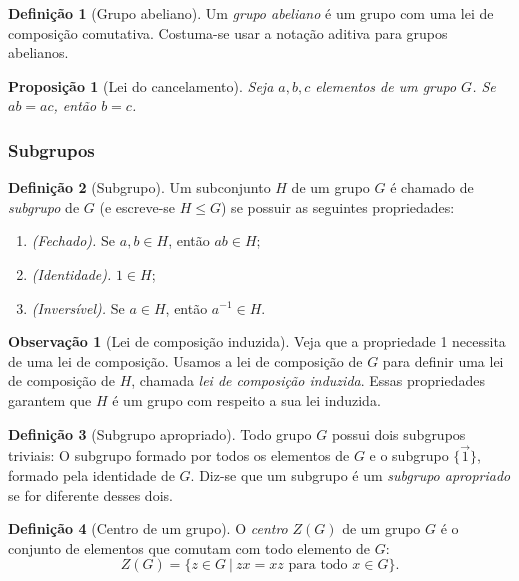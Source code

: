\documentclass[a4paper,12pt]{report}
\theoremstyle{plain}
\newtheorem{proposicao}{Proposição}[section]
\theoremstyle{definition}
\newtheorem{definicao}{Definição}[section]
\newtheorem{observacao}{Observação}[section]
\begin{document}
\begin{definicao}[Grupo abeliano]
	Um \emph{grupo abeliano} é um grupo com uma lei de
	composição comutativa. Costuma-se usar a notação aditiva para grupos
	abelianos.
\end{definicao}

\begin{proposicao}[Lei do cancelamento]
	Seja \(a,b,c\) elementos de um grupo \(G\). Se \(ab = ac\), então \(b = c\).
\end{proposicao} 

\subsubsection{Subgrupos}

\begin{definicao}[Subgrupo]
	Um subconjunto \(H\) de um grupo \(G\) é chamado de \emph{subgrupo} de \(G\) (e escreve-se $H \leq G$) se possuir as seguintes propriedades:
	
	\begin{enumerate}
		\item \emph{(Fechado).} Se \(a,b\in H\), então \(ab\in H\);
		\item \emph{(Identidade).} \(1\in H\);
		\item \emph{(Inversível).} Se \(a\in H\), então \(a^{-1}\in H\).
	\end{enumerate}
	
\end{definicao}

\begin{observacao}[Lei de composição induzida]
	Veja que a propriedade 1 necessita de uma lei de composição. Usamos a
	lei de composição de \(G\) para definir uma lei de composição de \(H\),
	chamada \emph{lei de composição induzida}. Essas propriedades garantem
	que \(H\) é um grupo com respeito a sua lei induzida.
\end{observacao}

\begin{definicao}[Subgrupo apropriado]
	Todo grupo \(G\) possui dois subgrupos triviais: O subgrupo formado por
	todos os elementos de \(G\) e o subgrupo \(\{\vec{1}\}\), formado pela
	identidade de \(G\). Diz-se que um subgrupo é um \emph{subgrupo apropriado} se for diferente desses dois.
\end{definicao}

\begin{definicao}[Centro de um grupo]
	O \emph{centro} \(Z(G)\) de um grupo \(G\) é o
	conjunto de elementos que comutam com todo elemento de \(G\):
	\[Z(G) = \{z \in G \ | \ zx = xz \text{ para todo } x \in G\}.\]
\end{definicao}
\end{document}
